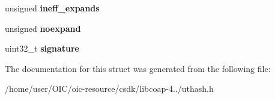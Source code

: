 \begin{DoxyCompactItemize}
\item 
\hypertarget{structUT__hash__table_a216c7d98cf40a0064bee94aa8a5bf1b7}{}unsigned {\bfseries ineff\+\_\+expands}\label{structUT__hash__table_a216c7d98cf40a0064bee94aa8a5bf1b7}

\item 
\hypertarget{structUT__hash__table_a635661789933752e7b83dac84430eae1}{}unsigned {\bfseries noexpand}\label{structUT__hash__table_a635661789933752e7b83dac84430eae1}

\item 
\hypertarget{structUT__hash__table_a87d1ab3f3ede1809c6a485972d20b25f}{}uint32\+\_\+t {\bfseries signature}\label{structUT__hash__table_a87d1ab3f3ede1809c6a485972d20b25f}

\end{DoxyCompactItemize}


The documentation for this struct was generated from the following file\+:\begin{DoxyCompactItemize}
\item 
/home/user/\+O\+I\+C/oic-\/resource/csdk/libcoap-\/4../uthash.\+h\end{DoxyCompactItemize}
